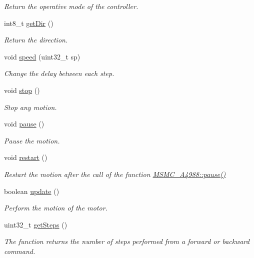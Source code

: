 \begin{DoxyCompactItemize}
\begin{DoxyCompactList}\small\item\em Return the operative mode of the controller. \end{DoxyCompactList}\item 
int8\+\_\+t \hyperlink{class_m_s_m_c___a4988_acf7598266c1ced18507d43f811c98db9}{get\+Dir} ()
\begin{DoxyCompactList}\small\item\em Return the direction. \end{DoxyCompactList}\item 
void \hyperlink{class_m_s_m_c___a4988_a6f9d236dc619342d16457aa029faeed9}{speed} (uint32\+\_\+t sp)
\begin{DoxyCompactList}\small\item\em Change the delay between each step. \end{DoxyCompactList}\item 
void \hyperlink{class_m_s_m_c___a4988_a4038481ce6b8131ea22d5e0d331ca6c7}{stop} ()
\begin{DoxyCompactList}\small\item\em Stop any motion. \end{DoxyCompactList}\item 
void \hyperlink{class_m_s_m_c___a4988_a321bc53bae537a0318910819a6a1a7d5}{pause} ()
\begin{DoxyCompactList}\small\item\em Pause the motion. \end{DoxyCompactList}\item 
void \hyperlink{class_m_s_m_c___a4988_add93aa459190c6edb3551495e75aaded}{restart} ()
\begin{DoxyCompactList}\small\item\em Restart the motion after the call of the function \hyperlink{class_m_s_m_c___a4988_a321bc53bae537a0318910819a6a1a7d5}{M\+S\+M\+C\+\_\+\+A4988\+::pause()} \end{DoxyCompactList}\item 
boolean \hyperlink{class_m_s_m_c___a4988_a409bea28b42827c8bd7d5e5e318af21d}{update} ()
\begin{DoxyCompactList}\small\item\em Perform the motion of the motor. \end{DoxyCompactList}\item 
uint32\+\_\+t \hyperlink{class_m_s_m_c___a4988_ab097e238a4a8c905e478ecff23907059}{get\+Steps} ()
\begin{DoxyCompactList}\small\item\em The function returns the number of steps performed from a forward or backward command. \end{DoxyCompactList}\end{DoxyCompactItemize}
